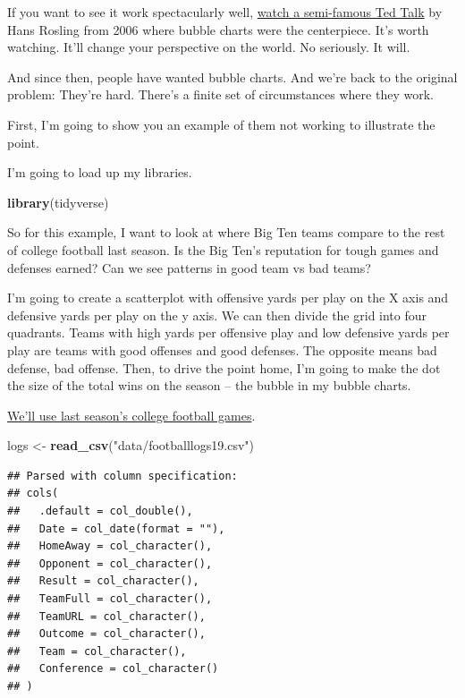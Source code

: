 \documentclass[
]{book}
\newenvironment{Shaded}{\begin{snugshade}}{\end{snugshade}}
\newcommand{\KeywordTok}[1]{\textcolor[rgb]{0.13,0.29,0.53}{\textbf{#1}}}
\newcommand{\NormalTok}[1]{#1}
\newcommand{\StringTok}[1]{\textcolor[rgb]{0.31,0.60,0.02}{#1}}
\begin{document}
If you want to see it work spectacularly well, \href{https://www.youtube.com/watch?v=hVimVzgtD6w}{watch a semi-famous Ted Talk} by Hans Rosling from 2006 where bubble charts were the centerpiece. It's worth watching. It'll change your perspective on the world. No seriously. It will.

And since then, people have wanted bubble charts. And we're back to the original problem: They're hard. There's a finite set of circumstances where they work.

First, I'm going to show you an example of them not working to illustrate the point.

I'm going to load up my libraries.

\begin{Shaded}
\begin{Highlighting}[]
\KeywordTok{library}\NormalTok{(tidyverse)}
\end{Highlighting}
\end{Shaded}

So for this example, I want to look at where Big Ten teams compare to the rest of college football last season. Is the Big Ten's reputation for tough games and defenses earned? Can we see patterns in good team vs bad teams?

I'm going to create a scatterplot with offensive yards per play on the X axis and defensive yards per play on the y axis. We can then divide the grid into four quadrants. Teams with high yards per offensive play and low defensive yards per play are teams with good offenses and good defenses. The opposite means bad defense, bad offense. Then, to drive the point home, I'm going to make the dot the size of the total wins on the season -- the bubble in my bubble charts.

\href{https://unl.box.com/s/2prgq48ctoxlukn6kmfjw0u1opda5s0m}{We'll use last season's college football games}.

\begin{Shaded}
\begin{Highlighting}[]
\NormalTok{logs <-}\StringTok{ }\KeywordTok{read_csv}\NormalTok{(}\StringTok{"data/footballlogs19.csv"}\NormalTok{)}
\end{Highlighting}
\end{Shaded}

\begin{verbatim}
## Parsed with column specification:
## cols(
##   .default = col_double(),
##   Date = col_date(format = ""),
##   HomeAway = col_character(),
##   Opponent = col_character(),
##   Result = col_character(),
##   TeamFull = col_character(),
##   TeamURL = col_character(),
##   Outcome = col_character(),
##   Team = col_character(),
##   Conference = col_character()
## )
\end{verbatim}
\end{document}
